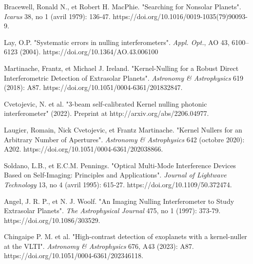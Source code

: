 \documentclass[]{spie}  %
\begin{document}
\begin{thebibliography}{60}

     Bracewell, Ronald N., et Robert H. MacPhie. "Searching for Nonsolar Planets". {\it Icarus} 38, no 1 (avril 1979): 136‑47. https://doi.org/10.1016/0019-1035(79)90093-9.

     Lay, O.P. "Systematic errors in nulling interferometers". {\it Appl. Opt.}, AO 43, 6100–6123 (2004). https://doi.org/10.1364/AO.43.006100

      Martinache, Frantz, et Michael J. Ireland. "Kernel-Nulling for a Robust Direct Interferometric Detection of Extrasolar Planets". {\it Astronomy \& Astrophysics} 619 (2018): A87. https://doi.org/10.1051/0004-6361/201832847.
    
    
     Cvetojevic, N. et al. "3-beam self-calibrated Kernel nulling photonic interferometer" (2022). Preprint at http://arxiv.org/abs/2206.04977.

     Laugier, Romain, Nick Cvetojevic, et Frantz Martinache. "Kernel Nullers for an Arbitrary Number of Apertures". {\it Astronomy \& Astrophysics} 642 (octobre 2020): A202. https://doi.org/10.1051/0004-6361/202038866.

     Soldano, L.B., et E.C.M. Pennings. "Optical Multi-Mode Interference Devices Based on Self-Imaging: Principles and Applications". {\it Journal of Lightwave Technology} 13, no 4 (avril 1995): 615‑27. https://doi.org/10.1109/50.372474.

     Angel, J. R. P., et N. J. Woolf. "An Imaging Nulling Interferometer to Study Extrasolar Planets". {\it The Astrophysical Journal} 475, no 1 (1997): 373‑79. https://doi.org/10.1086/303529.

     Chingaipe P. M. et al. "High-contrast detection of exoplanets with a kernel-nuller at the VLTI". {\it Astronomy \& Astrophysics} 676, A43 (2023): A87. https://doi.org/10.1051/0004-6361/202346118.




\end{thebibliography}
\end{document}
